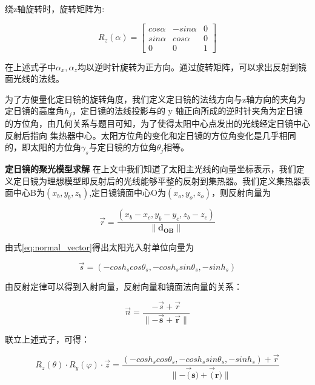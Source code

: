 \documentclass[withoutpreface,bwprint]{cumcmthesis} %
\begin{document}
绕z轴旋转时，旋转矩阵为:

\begin{equation}
    R_{z}(\alpha)=\left[\begin{array}{ccc}
            cos\alpha & -sin\alpha & 0 \\
            sin\alpha & cos\alpha  & 0 \\
            0         & 0          & 1
        \end{array}\right] \label{eq:rotate_z}
\end{equation}

在上述式子中$\alpha_{x},\alpha_{z}$均以逆时针旋转为正方向。通过旋转矩阵，可以求出反射到镜面光线的法线。

为了方便量化定日镜的旋转角度，我们定义定日镜的法线方向与z轴方向的夹角为定日镜的高度角$h_{j}$，定日镜的法线投影与的 y 轴正向所成的逆时针夹角为定日镜的方位角，由几何关系与题目可知，为了使得太阳中心点发出的光线经定日镜中心反射后指向 集热器中心。太阳方位角的变化和定日镜的方位角变化是几乎相同的，即太阳的方位角$\gamma_{s}$与定日镜的方位角$\theta_{j}$相等。

\textbf{定日镜的聚光模型求解} \space 在上文中我们知道了太阳主光线的向量坐标表示，我们定义定日镜为理想模型即反射后的光线能够平整的反射到集热器。我们定义集热器表面中心B为$(x_{b},y_{b},z_{b})$,定日镜镜面中心O为$(x_{o},y_{o},z_{o})$，则反射向量为

\begin{equation}
    \vec{r}=\frac{(x_{b}-x_{c},y_{b}-y_{c},z_{b}-z_{c})}{\| \mathbf{d_{OB}} \|}
\end{equation}

由式\ref{eq:normal_vector}得出太阳光入射单位向量为

\begin{equation}
    \vec{s}=(-cosh_{s}cos\theta_{s},-cosh_{s}sin\theta_{s},-sinh_{s})
\end{equation}

由反射定律可以得到入射向量，反射向量和镜面法向量的关系：

\begin{equation}
    \vec{n}=\frac{-\vec{s}+\vec{r}}{\| \mathbf{{-\vec{s}+\vec{r}}\|}}
\end{equation}

联立上述式子，可得：

\begin{equation}
    R_{z}(\theta)\cdot R_{y}(\varphi)\cdot \vec{z}=\frac{(-cosh_{s}cos\theta_{s},-cosh_{s}sin\theta_{s},-sinh_{s})+\vec{r}}{\| \mathbf{{-\vec(s)+\vec(r)}}\|} \label{eq:normal_vector}
\end{equation}
\end{document}
